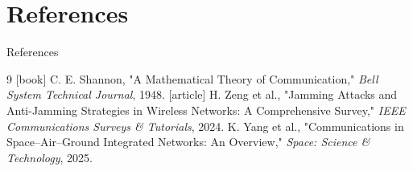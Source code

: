 \documentclass[11pt, aspectratio=169]{beamer}
\begin{document}
\section{References}
\begin{frame}[allowframebreaks]{References}
  \begin{thebibliography}{9}
    [book]
      C. E. Shannon, "A Mathematical Theory of Communication," 
      \textit{Bell System Technical Journal}, 1948.
    [article]
      H. Zeng et al., "Jamming Attacks and Anti-Jamming Strategies in Wireless Networks: A Comprehensive Survey," 
      \textit{IEEE Communications Surveys \& Tutorials}, 2024.
      K. Yang et al., "Communications in Space–Air–Ground Integrated Networks: An Overview," 
      \textit{Space: Science \& Technology}, 2025.
  \end{thebibliography}
\end{frame}
\end{document}
